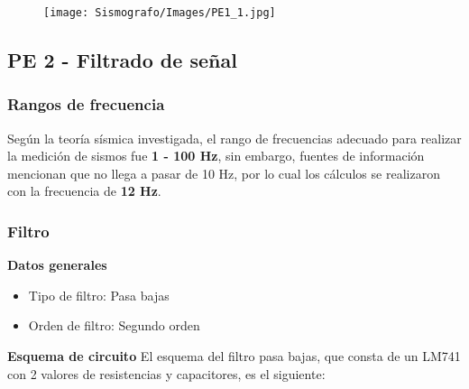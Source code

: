 \documentclass[12pt]{article}
\begin{document}
	        \begin{figure}[h!]
                \centering
                \texttt{[image: Sismografo/Images/PE1\_1.jpg]}
            \end{figure} 
	        \newpage
	    \subsection{PE 2 - Filtrado de señal}
	        \subsubsection{Rangos de frecuencia}
	        Según la teoría sísmica investigada, el rango de frecuencias adecuado para realizar la medición de sismos fue \textbf{1 - 100 Hz}, sin embargo, fuentes de información mencionan que no llega a pasar de 10 Hz, por lo cual los cálculos se realizaron con la frecuencia de \textbf{12 Hz}.
	        
	        \subsubsection{Filtro}
	        \textbf{Datos generales}
	        \begin{itemize}
	            \item Tipo de filtro: Pasa bajas
	            \item Orden de filtro: Segundo orden
	        \end{itemize}
	        
	        
	        \textbf{Esquema de circuito}
	        El esquema del filtro pasa bajas, que consta de un LM741 con 2 valores de resistencias y capacitores, es el siguiente:
	       
\end{document}
